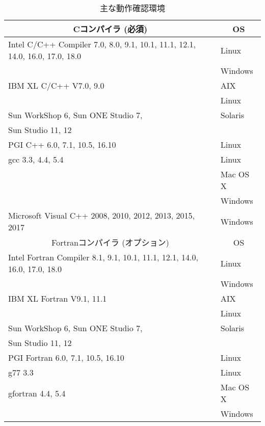 \documentclass[a4paper]{jarticle}
\begin{document}
\begin{table}[htbp]
\caption{主な動作確認環境}
\label{platforms}
\begin{center}
{\small
 \begin{tabular}{l|l}
\hline
\multicolumn{1}{c|}{Cコンパイラ (必須) } & \multicolumn{1}{c}{OS} \\
\hline
Intel C/C++ Compiler 7.0, 8.0, 9.1, 10.1, 11.1, 12.1, 14.0, 16.0, 17.0, 18.0 & Linux \\
                                                     & Windows  \\
\hline
IBM XL C/C++ V7.0, 9.0                     & AIX   \\
                                           & Linux \\
\hline
Sun WorkShop 6, Sun ONE Studio 7,          & Solaris \\
Sun Studio 11, 12                          &         \\
\hline
PGI C++ 6.0, 7.1, 10.5, 16.10              & Linux \\
\hline
gcc 3.3, 4.4, 5.4                          & Linux \\
                                           & Mac OS X \\
                                           & Windows \\
\hline
Microsoft Visual C++ 2008, 2010, 2012, 2013, 2015, 2017       & Windows \\
\hline
\hline
\multicolumn{1}{c|}{Fortranコンパイラ (オプション) } & \multicolumn{1}{c}{OS} \\
\hline
Intel Fortran Compiler 8.1, 9.1, 10.1, 11.1, 12.1, 14.0, 16.0, 17.0, 18.0 & Linux \\
                                                  & Windows  \\
\hline
IBM XL Fortran V9.1, 11.1                  & AIX     \\
                                           & Linux   \\
\hline
Sun WorkShop 6, Sun ONE Studio 7,          & Solaris \\
Sun Studio 11, 12                          &         \\
\hline
PGI Fortran 6.0, 7.1, 10.5, 16.10          & Linux \\
\hline
g77 3.3                                    & Linux \\
gfortran 4.4, 5.4                          & Mac OS X \\
                                           & Windows \\
\hline
\end{tabular}
}
\end{center}
\end{table} 
\end{document}
